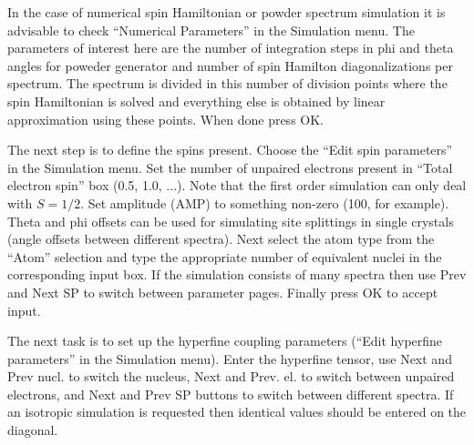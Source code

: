 \documentclass[byrevtex,amssymb,aps,pra,floatfix,letterpaper]{revtex4}
\begin{document}
In the case of numerical spin Hamiltonian or powder spectrum simulation it is advisable to check ``Numerical Parameters'' in the Simulation menu. The parameters of interest here are the number of integration steps in phi and theta angles for poweder generator and number of spin Hamilton diagonalizations per spectrum. The spectrum is divided in this number of division points where the spin Hamiltonian is solved and everything else is obtained by linear approximation using these points. When done press OK.

The next step is to define the spins present. Choose the ``Edit spin parameters'' in the Simulation menu. Set the number of unpaired electrons present in ``Total electron spin'' box (0.5, 1.0, ...). Note that the first order simulation can only deal with $S = 1/2$. Set amplitude (AMP) to something non-zero (100, for example). Theta and phi offsets can be used for simulating site splittings in single crystals (angle offsets between different spectra). Next select the atom type from the ``Atom'' selection and type the appropriate number of equivalent nuclei in the corresponding input box. If the simulation consists of many spectra then use Prev and Next SP to switch between parameter pages. Finally press OK to accept input.

The next task is to set up the hyperfine coupling parameters (``Edit hyperfine parameters'' in the Simulation menu). Enter the hyperfine tensor, use Next and Prev nucl. to switch the nucleus, Next and Prev. el. to switch between unpaired electrons, and Next and Prev SP buttons to switch between different spectra. If an isotropic simulation is requested then identical values should be entered on the diagonal.
\end{document}
